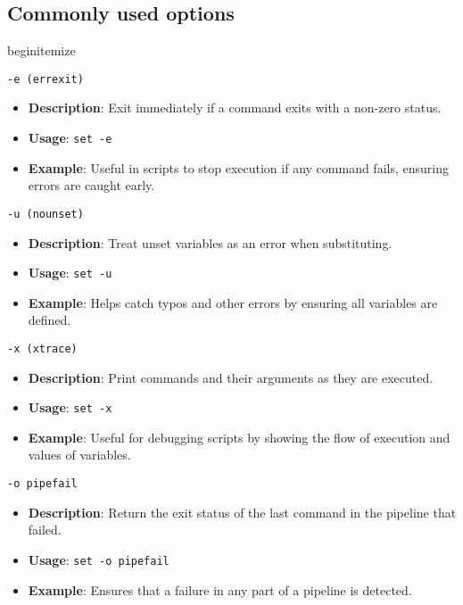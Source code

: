 \documentclass{report}
\begin{document}
    \bigbreak \noindent 
    \subsection{Commonly used options}
    begin{itemize}
    \item \texttt{-e (errexit)}
        \begin{itemize}
            \item \textbf{Description}: Exit immediately if a command exits with a non-zero status.
            \item \textbf{Usage}: \texttt{set -e}
            \item \textbf{Example}: Useful in scripts to stop execution if any command fails, ensuring errors are caught early.
        \end{itemize}

    \item \texttt{-u (nounset)}
        \begin{itemize}
            \item \textbf{Description}: Treat unset variables as an error when substituting.
            \item \textbf{Usage}: \texttt{set -u}
            \item \textbf{Example}: Helps catch typos and other errors by ensuring all variables are defined.
        \end{itemize}

    \item \texttt{-x (xtrace)}
        \begin{itemize}
            \item \textbf{Description}: Print commands and their arguments as they are executed.
            \item \textbf{Usage}: \texttt{set -x}
            \item \textbf{Example}: Useful for debugging scripts by showing the flow of execution and values of variables.
        \end{itemize}

    \item \texttt{-o pipefail}
        \begin{itemize}
            \item \textbf{Description}: Return the exit status of the last command in the pipeline that failed.
            \item \textbf{Usage}: \texttt{set -o pipefail}
            \item \textbf{Example}: Ensures that a failure in any part of a pipeline is detected.
        \end{itemize}
\end{document}
